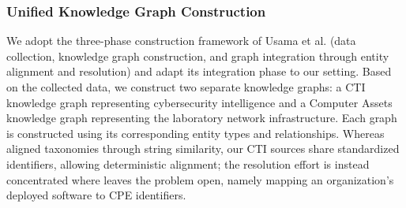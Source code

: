\documentclass[conference]{IEEEtran}
\begin{document}
\subsubsection{\textbf{Unified Knowledge Graph Construction}}  We adopt the three-phase construction framework of Usama et al. \cite{b1} (data collection, knowledge graph construction, and graph integration through entity alignment and resolution) and adapt its integration phase to our setting. Based on the collected data, we construct two separate knowledge graphs: a CTI knowledge graph representing cybersecurity intelligence and a Computer Assets knowledge graph representing the laboratory network infrastructure. Each graph is constructed using its corresponding entity types and relationships. Whereas \cite{b1} aligned taxonomies through string similarity, our CTI sources share standardized identifiers, allowing deterministic alignment; the resolution effort is instead concentrated where \cite{b1} leaves the problem open, namely mapping an organization’s deployed software to CPE identifiers.
\end{document}
